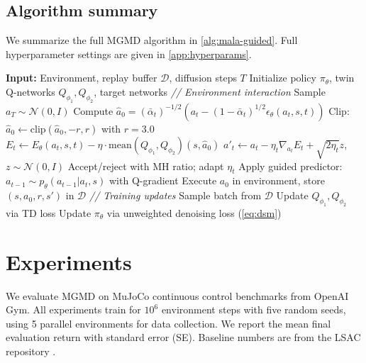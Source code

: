 \documentclass{article}
\theoremstyle{plain}
\theoremstyle{definition}
\theoremstyle{remark}
\begin{document}
\subsection{Algorithm summary}
\label{sec:algorithm}

We summarize the full MGMD algorithm in \cref{alg:mala-guided}.
Full hyperparameter settings are given in \cref{app:hyperparams}.

\begin{algorithm}[t]
\caption{MALA-Guided Mirror Descent (MGMD)}
\label{alg:mala-guided}
\begin{algorithmic}[1]
\STATE \textbf{Input:} Environment, replay buffer $\mathcal{D}$, diffusion steps $T$
\STATE Initialize policy $\pi_\theta$, twin Q-networks $Q_{\phi_1}, Q_{\phi_2}$, target networks
  \STATE \textit{// Environment interaction}
  \STATE Sample $a_T \sim \mathcal{N}(0, I)$
    \STATE Compute $\hat{a}_0 = (\bar{\alpha}_t)^{-1/2}(a_t - (1-\bar{\alpha}_t)^{1/2}\epsilon_\theta(a_t, s, t))$
    \STATE Clip: $\hat{a}_0 \leftarrow \text{clip}(\hat{a}_0, -r, r)$ with $r=3.0$
      \STATE $E_t \leftarrow E_\theta(a_t, s, t) - \eta \cdot \text{mean}(Q_{\phi_1}, Q_{\phi_2})(s, \hat{a}_0)$
      \STATE $a'_t \leftarrow a_t - \eta_t \nabla_{a_t} E_t + \sqrt{2\eta_t} z$, $z \sim \mathcal{N}(0,I)$
      \STATE Accept/reject with MH ratio; adapt $\eta_t$
    \ENDFOR
    \STATE Apply guided predictor: $a_{t-1} \sim p_\theta(a_{t-1} | a_t, s)$ with Q-gradient
  \ENDFOR
  \STATE Execute $a_0$ in environment, store $(s, a_0, r, s')$ in $\mathcal{D}$
  \STATE \textit{// Training updates}
    \STATE Sample batch from $\mathcal{D}$
    \STATE Update $Q_{\phi_1}, Q_{\phi_2}$ via TD loss
    \STATE Update $\pi_\theta$ via unweighted denoising loss (\cref{eq:dsm})
  \ENDFOR
\ENDFOR
\end{algorithmic}
\end{algorithm}

\section{Experiments}
\label{sec:experiments}

We evaluate MGMD on MuJoCo continuous control benchmarks from OpenAI Gym.
All experiments train for $10^6$ environment steps with five random seeds, using 5 parallel environments for data collection.
We report the mean final evaluation return with standard error (SE).
Baseline numbers are from the LSAC repository \citep{lsac2025}.
\end{document}
